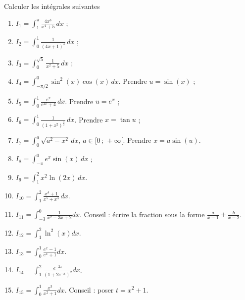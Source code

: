 
\begin{exercice}\label{exoTD5-00002}
 
  Calculer les intégrales suivantes 
  \begin{multicols}{2}
    \begin{enumerate}
    \item $I_{1}=\displaystyle \int_{1}^{\pi} \frac{4x^3}{x^4+5}\, dx$ ;
    \item $I_{2}=\displaystyle \int_{0}^{1}\frac{1}{(4x+1)^4}\, dx $ ;
    \item $I_{3}=\displaystyle \int_{0}^{\sqrt{5}}\frac{1}{x^2+5}\, dx$ ;
    \item $I_{4}=\displaystyle \int_{-\pi/2}^{0} \sin^2(x)\cos(x) \, dx $. Prendre $u=\sin(x)$ ;
    \item $I_{5}=\displaystyle\int_{0}^{1}\frac{e^x}{e^{2x}+4} \, dx$. Prendre $u = e^x$ ;
    \item $I_{6}=\displaystyle\int_{0}^{1}\frac{1}{(1+x^2)^{\frac{3}{2}}}\, dx $. Prendre $x=\tan u$ ;
    \item $I_{7}=\displaystyle\int_{0}^{a}\sqrt{a^2-x^2} \, dx$, $a \in [0\,;\,+\infty[$.  Prendre $x=a\sin (u)$. 
      \item $\displaystyle I_{8}=\int_{-\pi}^{0} e^x\sin(x) \, dx $ ;
      \item $\displaystyle I_{9}=\int_{1}^{2} x^2\ln(2x) \, dx$.
      \item $\displaystyle I_{10}=\int_{1}^{2}\frac{x^4+1}{x^5+x^3}\, dx $.
      \item $\displaystyle I_{11}=\int_{-3}^0\frac{1}{ x^2-3x+2 }dx$. Conseil : écrire la fraction sous la forme $\frac{ a }{ x-1 }+\frac{ b }{ x-2 }$.
      \item $\displaystyle I_{12}=\int_1^2\ln^2(x)dx$.
      \item  $\displaystyle I_{13}=\int_0^1\frac{ e^x-1 }{ e^x+1 }dx$.
      \item $\displaystyle I_{14}=\int_1^2\frac{  e^{-2x} }{ (1+2 e^{-x})^2 }dx$.
      \item $\displaystyle I_{15}=\int_0^1\frac{ x^3 }{ x^2+1 }dx$. Conseil : poser $t=x^2+1$.
  \end{enumerate}
\end{multicols}
  
\end{exercice}
